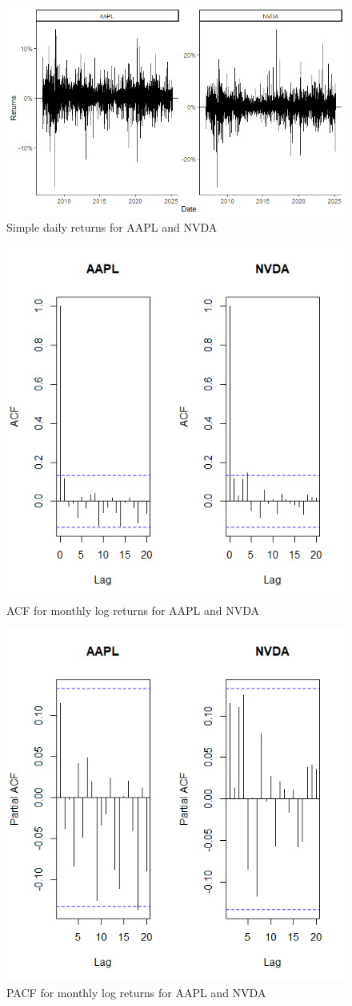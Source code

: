 \documentclass[12pt]{article}
\begin{document}
\begin{figure}[h]
	\centering
	\includegraphics[width=0.8\linewidth]{plots/aapl_nvda_returns.png}
	\caption{Simple daily returns for AAPL and NVDA}
\end{figure}

\begin{figure}[h]
	\centering
	\includegraphics[width=0.6\linewidth]{plots/acf_aapl_nvda.png}
	\caption{ACF for monthly log returns for AAPL and NVDA}
\end{figure}

\begin{figure}[h]
	\centering
	\includegraphics[width=0.6\linewidth]{plots/pacf_aapl_nvda.png}
	\caption{PACF for monthly log returns for AAPL and NVDA}
\end{figure}
\end{document}
